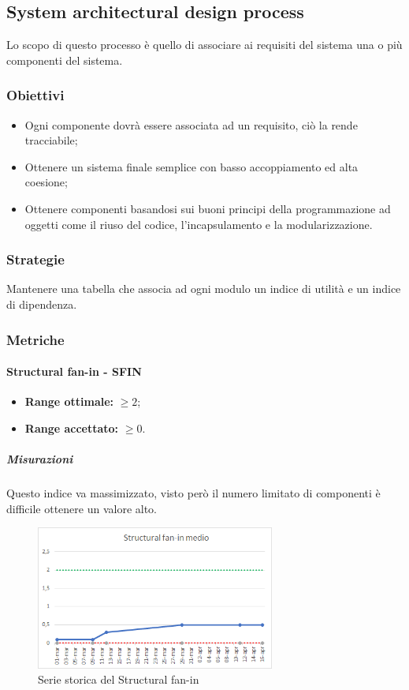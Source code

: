 \subsection{System architectural design process}
Lo scopo di questo processo è quello di associare ai requisiti del sistema una o più componenti del sistema.
		\subsubsection{Obiettivi}
		\begin{itemize}
			\item Ogni componente dovrà essere associata ad un requisito, ciò la rende tracciabile;
			\item Ottenere un sistema finale semplice con basso accoppiamento ed alta coesione;
			\item Ottenere componenti basandosi sui buoni principi della programmazione ad oggetti come il riuso del codice, l'incapsulamento e la modularizzazione.
		\end{itemize}
		\subsubsection{Strategie}
		Mantenere una tabella che associa ad ogni modulo un indice di utilità e un indice di dipendenza.
		\subsubsection{Metriche}
			\paragraph{Structural fan-in - SFIN} \Spazio
			\begin{itemize}
				\item \textbf{Range ottimale:} $\geq 2$;
				\item \textbf{Range accettato:} $\geq 0$.
			\end{itemize}
		    \subparagraph{Misurazioni}
		    Questo indice va massimizzato, visto però il numero limitato di componenti è difficile ottenere un valore alto.
		    \begin{figure}[H]
		    	\centering 
		    	\includegraphics[width=0.7\textwidth]{Images/SFIN.png}
		    	\caption{Serie storica del Structural fan-in}
		    	\label{SFIN} 
		    \end{figure}
